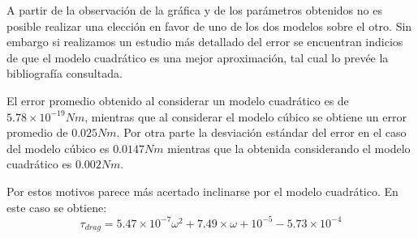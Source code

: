 \documentclass[spanish,12pt,a4paper,titlepage]{report}
\begin{document}
A partir de la observación de la gráfica y de los parámetros obtenidos no es posible realizar una elección en favor de uno de los dos modelos sobre el otro. Sin embargo si realizamos un estudio más detallado del error se encuentran indicios de que el modelo cuadrático es una mejor aproximación, tal cual lo prevée la bibliografía consultada. 

El error promedio obtenido al considerar un modelo cuadrático es de $5.78 \times 10^{-19} Nm$, mientras que al considerar el modelo cúbico se obtiene un error promedio de $0.025Nm$. Por otra parte la desviación estándar del error en el caso del modelo cúbico es $0.0147Nm$ mientras que la obtenida considerando el modelo cuadrático es $0.002Nm$.

Por estos motivos parece más acertado inclinarse por el modelo cuadrático. En este caso se obtiene:
\begin{equation}
\tau_{drag}=5.47 \times 10^{-7}\omega ^2+7.49 \times \omega + 10^{-5}-5.73 \times 10^{-4}
\end{equation} 
\end{document}
